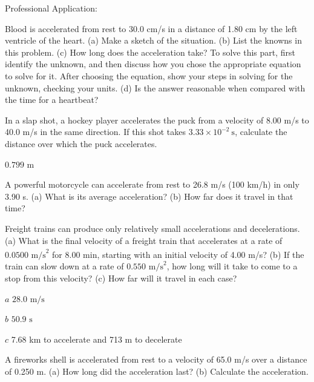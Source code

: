 \documentclass[
]{book}
\newenvironment{problems-exercises}{}{}
\newenvironment{tinysection}{}{}
\begin{document}
\begin{problems-exercises}
\begin{tinysection}
{Professional Application:}

\end{tinysection}

Blood is accelerated from rest to 30.0 cm/s in a distance of 1.80 cm by
the left ventricle of the heart. (a) Make a sketch of the situation. (b)
List the knowns in this problem. (c) How long does the acceleration
take? To solve this part, first identify the unknown, and then discuss
how you chose the appropriate equation to solve for it. After choosing
the equation, show your steps in solving for the unknown, checking your
units. (d) Is the answer reasonable when compared with the time for a
heartbeat?

\hypertarget{fs-id1164906467421}{}
\leavevmode\hypertarget{fs-id1164906467424}{}%
In a slap shot, a hockey player accelerates the puck from a velocity of
8.00 m/s to 40.0 m/s in the same direction. If this shot takes
\({3\text{.}\text{33} \times \text{10}^{- 2}\ \text{s}}{}\), calculate the
distance over which the puck accelerates.

\leavevmode\hypertarget{fs-id1164906461971}{}%
\({0\text{.}\text{799\ m}}{}\)

\hypertarget{fs-id1164906508513}{}
\leavevmode\hypertarget{fs-id1164906508516}{}%
A powerful motorcycle can accelerate from rest to 26.8 m/s (100 km/h) in
only 3.90 s. (a) What is its average acceleration? (b) How far does it
travel in that time?

\hypertarget{fs-id1164906451358}{}
\leavevmode\hypertarget{fs-id1164906451361}{}%
Freight trains can produce only relatively small accelerations and
decelerations. (a) What is the final velocity of a freight train that
accelerates at a rate of
\({0\text{.}\text{0500\ m/s}^{2}}{}\)\textsuperscript{} for
8.00 min, starting with an initial velocity of 4.00 m/s? (b) If the
train can slow down at a rate of \({0\text{.}\text{550\ m/s}^{2}}{}\), how
long will it take to come to a stop from this velocity? (c) How far will
it travel in each case?

\leavevmode\hypertarget{fs-id1164906495779}{}%
\(a\) \({\text{28}\text{.}\text{0\ m/s}}{}\)

\(b\) \({\text{50}\text{.}\text{9\ s}}{}\)

\(c\) 7.68 km to accelerate and 713 m to decelerate

\hypertarget{fs-id1164906430928}{}
\leavevmode\hypertarget{fs-id1164906430931}{}%
A fireworks shell is accelerated from rest to a velocity of 65.0 m/s
over a distance of 0.250 m. (a) How long did the acceleration last? (b)
Calculate the acceleration.


\end{problems-exercises}
\end{document}
